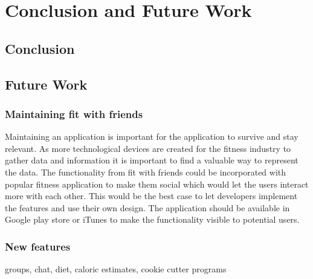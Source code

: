 \chapter{Conclusion and Future Work}
\section{Conclusion}
\section{Future Work}
\subsection{Maintaining fit with friends}
Maintaining an application is important for the application to survive and stay relevant. As more technological devices are created for the fitness industry to gather data and information it is important to find a valuable way to represent the data. The functionality from fit with friends could be incorporated with  popular fitness application to make them social which would let the users interact more with each other. This would be the best case to let developers implement the features and use their own design. The application should be available in Google play store or iTunes to make the functionality visible to potential users. 

\subsection{New features}

groups,
chat, 
diet,
caloric estimates,
cookie cutter programs

